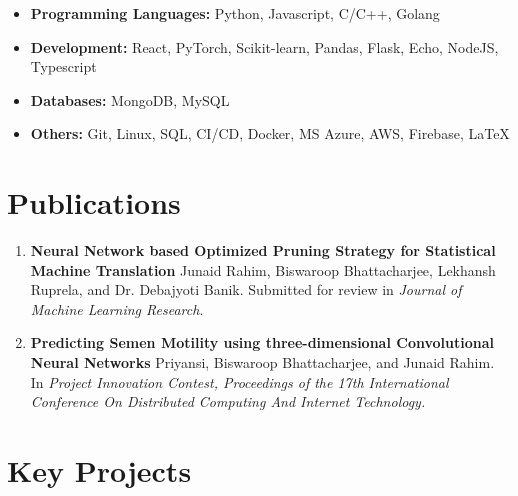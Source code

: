 \documentclass[11pt,a4paper,calibri]{moderncv}        %
\begin{document}
	\begin{itemize}[leftmargin=.2in]
		\setlength\itemsep{.2em}
		
		\item \textbf{Programming Languages:} Python, Javascript, C/C++, Golang
		\vspace{-4pt}
		\item \textbf{Development:} React, PyTorch, Scikit-learn,  Pandas, Flask, Echo, NodeJS, Typescript
		\vspace{-4pt}
		\item \textbf{Databases:} MongoDB, MySQL
		\vspace{-4pt}
		\item \textbf{Others:} Git, Linux, SQL, CI/CD, Docker, MS Azure, AWS, Firebase, \LaTeX
		
	\end{itemize}

	\vspace{-15pt}
	\section{Publications}
	
	\begin{enumerate}
		\item \textbf{Neural Network based Optimized Pruning Strategy for
			Statistical Machine Translation} Junaid Rahim, Biswaroop Bhattacharjee, Lekhansh Ruprela, and Dr. Debajyoti Banik. Submitted for review in \textit{Journal of Machine Learning Research}.
		
		\item \textbf{Predicting Semen Motility using three-dimensional
			Convolutional Neural Networks} Priyansi, Biswaroop Bhattacharjee, and Junaid Rahim. In \textit{Project Innovation Contest, Proceedings of the 17th International Conference On Distributed Computing And Internet Technology.
		}
	\end{enumerate}
	
	\vspace{-15pt}
	\section{Key Projects}
	
\end{document}
